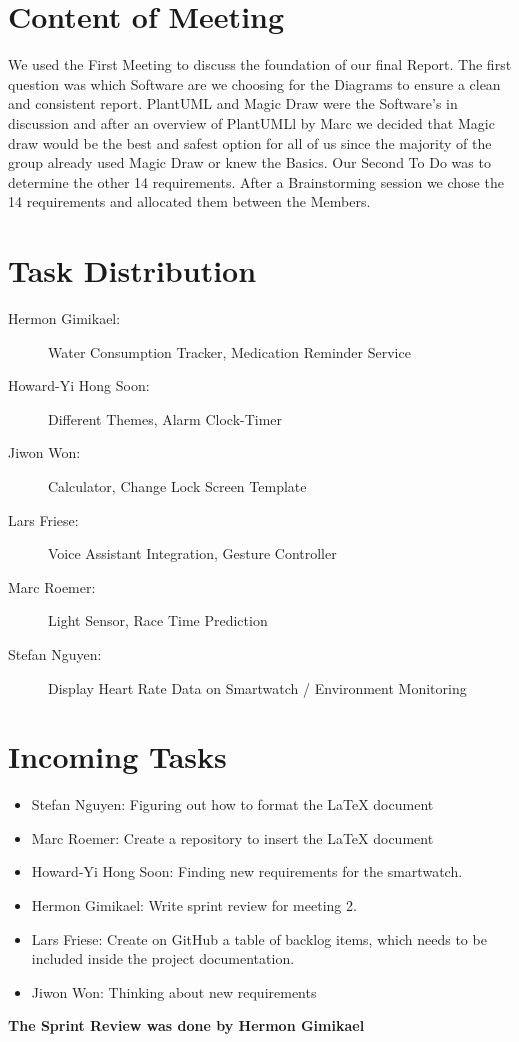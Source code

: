 \documentclass{article}
\begin{document}
\section*{Content of Meeting}
We used the First Meeting to discuss the foundation of our final Report. The first question was which Software are we choosing for the Diagrams to ensure a clean and consistent report. PlantUML and Magic Draw were the Software’s in discussion and after an overview of PlantUMLl by Marc we decided that Magic draw would be the best and safest option for all of us since the majority of the group already used Magic Draw or knew the Basics. Our Second To Do was to determine the other 14 requirements. After a Brainstorming session we chose the 14 requirements and allocated them between the Members.

\section*{Task Distribution}
\begin{description}
    \item[Hermon Gimikael:] Water Consumption Tracker, Medication Reminder Service
    \item[Howard-Yi Hong Soon:] Different Themes, Alarm Clock-Timer
    \item[Jiwon Won:] Calculator, Change Lock Screen Template
    \item[Lars Friese:] Voice Assistant Integration, Gesture Controller
    \item[Marc Roemer:] Light Sensor, Race Time Prediction
    \item[Stefan Nguyen:] Display Heart Rate Data on Smartwatch / Environment Monitoring
\end{description}

\section*{Incoming Tasks}
\begin{itemize}
    \item Stefan Nguyen: Figuring out how to format the LaTeX document
    \item Marc Roemer: Create a repository to insert the LaTeX document
    \item Howard-Yi Hong Soon: Finding new requirements for the smartwatch.
    \item Hermon Gimikael: Write sprint review for meeting 2.
    \item Lars Friese: Create on GitHub a table of backlog items, which needs to be included inside the project documentation.
    \item Jiwon Won: Thinking about new requirements
\end{itemize}
\noindent
\textbf{The Sprint Review was done by Hermon Gimikael}
\newpage
\end{document}
